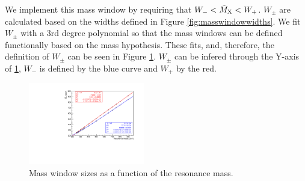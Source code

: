 We implement this mass window by requiring that $W_{-} < \tilde{M}_{\mathrm{X}} < W_{+}$. 
$W_{\pm}$ are calculated based on the widths defined in Figure \ref{fig:masswindowwidths}. 
We fit $W_{\pm}$ with a 3rd degree polynomial so that the mass windows can be defined functionally based on the mass hypothesis. 
These fits, and, therefore, the definition of $W_{\pm}$ can be seen in Figure \ref{fig:masswindowfit}. 
$W_{\pm}$ can be infered through the Y-axis of \ref{fig:masswindowfit}, $W_{-}$ is defined by the blue curve and $W_{+}$ by the red. 

\begin{figure}[h]
  \centering
  \includegraphics[width=0.45\textwidth]{figures/sec-window/fit_60_prime.pdf}\hfil

  \caption{Mass window sizes as a function of the resonance mass. }
  \label{fig:masswindowfit}
\end{figure}


